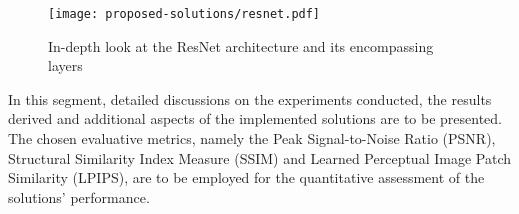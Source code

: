 \begin{figure}[ht]
    \centering
    \texttt{[image: proposed-solutions/resnet.pdf]}
    \caption{In-depth look at the ResNet architecture and its encompassing layers}
    \label{fig:resnet}
\end{figure}


In this segment, detailed discussions on the experiments conducted, the results derived and additional aspects of the implemented solutions are to be presented. The chosen evaluative metrics, namely the Peak Signal-to-Noise Ratio (PSNR), Structural Similarity Index Measure (SSIM) and Learned Perceptual Image Patch Similarity (LPIPS), are to be employed for the quantitative assessment of the solutions' performance.

